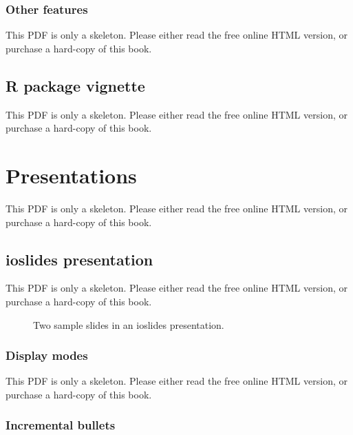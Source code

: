 \documentclass[
  11pt,
]{krantz}
\theoremstyle{definition}
\theoremstyle{definition}
\theoremstyle{definition}
\theoremstyle{definition}
\theoremstyle{remark}
\begin{document}
\begin{table}\caption{\label{tab:markdown-variant} Markdown variants for some popular publishing systems.}\end{table}

\subsection{Other features}\label{other-features-4}

This PDF is only a skeleton. Please either read the free online HTML version, or purchase a hard-copy of this book.

\section{R package vignette}\label{r-package-vignette}

This PDF is only a skeleton. Please either read the free online HTML version, or purchase a hard-copy of this book.

\chapter{Presentations}\label{presentations}

This PDF is only a skeleton. Please either read the free online HTML version, or purchase a hard-copy of this book.

\section{ioslides presentation}\label{ioslides-presentation}

This PDF is only a skeleton. Please either read the free online HTML version, or purchase a hard-copy of this book.

\begin{figure}\caption{Two sample slides in an ioslides presentation.}\end{figure}

\subsection{Display modes}\label{display-modes}

This PDF is only a skeleton. Please either read the free online HTML version, or purchase a hard-copy of this book.

\subsection{Incremental bullets}\label{incremental-bullets}
\end{document}
